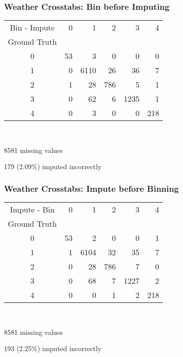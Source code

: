 \begin{frame}[t]
	\frametitle{Weather Crosstabs:  Bin before Imputing}
	\Large

\begin{tabular}{crrrrr}
Bin - Impute &   0 &     1 &    2 &     3 &    4 \\
Ground Truth &     &       &      &       &      \\
\hline
0       &  53 &     3 &    0 &     0 &    0 \\
1       &   0 &  6110 &   26 &    36 &    7 \\
2       &   1 &    28 &  786 &     5 &    1 \\
3       &   0 &    62 &    6 &  1235 &    1 \\
4       &   0 &     3 &    0 &     0 &  218 \\
\end{tabular}

\

8581 missing values

179 (2.09\%) imputed incorrectly

\end{frame}


\begin{frame}[t]
	\frametitle{Weather Crosstabs:  Impute before Binning}
	\Large

\begin{tabular}{crrrrr}
Impute - Bin &   0 &     1 &    2 &     3 &    4 \\
Ground Truth &     &       &      &       &      \\
\hline
0       &  53 &     2 &    0 &     0 &    1 \\
1       &   1 &  6104 &   32 &    35 &    7 \\
2       &   0 &    28 &  786 &     7 &    0 \\
3       &   0 &    68 &    7 &  1227 &    2 \\
4       &   0 &     0 &    1 &     2 &  218 \\
\end{tabular}

\

8581 missing values

193 (2.25\%) imputed incorrectly

\end{frame}

